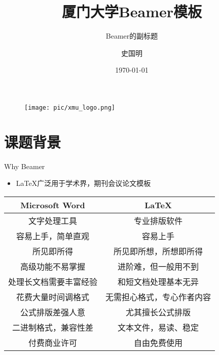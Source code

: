 \documentclass{beamer}
\author[SGM]{史国明}
\title{厦门大学\textrm{Beamer}模板}
\subtitle{\textrm{Beamer的副标题}}
\institute{厦门大学xxxx学院xxxx系}
\date{\today}
\begin{document}
\begin{frame}
    \titlepage
    \begin{figure}[htpb]
       \begin{center}
            \texttt{[image: pic/xmu\_logo.png]}
        \end{center}
    \end{figure}
\end{frame}

\begin{frame}
    \tableofcontents[sectionstyle=show,subsectionstyle=show/shaded/hide,subsubsectionstyle=show/shaded/hide]
\end{frame}


\section{课题背景}

\begin{frame}{Why Beamer}
	\begin{itemize}
		\item \LaTeX 广泛用于学术界，期刊会议论文模板
	\end{itemize}
	\begin{table}[h]
		\centering
		\begin{tabular}{c|c}
			Microsoft\textsuperscript{\textregistered}  Word & \LaTeX \\
			\hline
			文字处理工具 & 专业排版软件 \\
			容易上手，简单直观 & 容易上手 \\
			所见即所得 & 所见即所想，所想即所得 \\
			高级功能不易掌握 & 进阶难，但一般用不到 \\
			处理长文档需要丰富经验 & 和短文档处理基本无异 \\
			花费大量时间调格式 & 无需担心格式，专心作者内容 \\
			公式排版差强人意 & 尤其擅长公式排版 \\
			二进制格式，兼容性差 & 文本文件，易读、稳定 \\
			付费商业许可 & 自由免费使用 \\
		\end{tabular}
	\end{table}
\end{frame}
\end{document}

